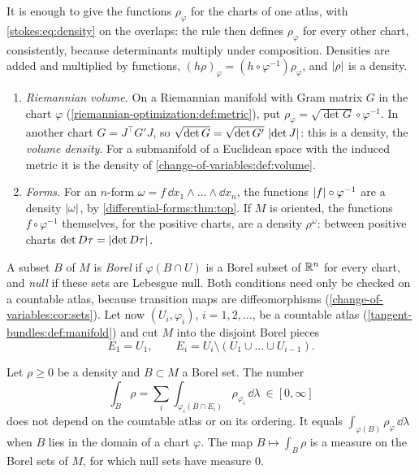\begin{notechapter}
It is enough to give the functions $\rho_\varphi$ for the charts of one
atlas, with \eqref{stokes:eq:density} on the overlaps: the rule then
defines $\rho_\varphi$ for every other chart, consistently, because
determinants multiply under composition. Densities are added and
multiplied by functions, $(h\rho)_\varphi
= (h\circ\varphi^{-1})\rho_\varphi$, and $\left|\rho\right|$ is a density.

\begin{example}\label{stokes:ex:densities}
\begin{enumerate}[nosep]
  \item \emph{Riemannian volume.} On a Riemannian manifold with Gram
        matrix $G$ in the chart $\varphi$
        (\cref{riemannian-optimization:def:metric}), put
        $\rho_\varphi = \sqrt{\det G}\circ\varphi^{-1}$. In another
        chart $G = J^\top G'J$, so
        $\sqrt{\det G} = \sqrt{\det G'}\,\left|\det J\right|$: this is a
        density, the \emph{volume density}. For a submanifold of a
        Euclidean space with the induced metric it is the density of
        \cref{change-of-variables:def:volume}.
  \item \emph{Forms.} For an $n$-form
        $\omega = f\,\dd x_1\wedge\dots\wedge\dd x_n$, the functions
        $\left|f\right|\circ\varphi^{-1}$ are a density $\left|\omega\right|$, by
        \cref{differential-forms:thm:top}. If $M$ is oriented, the
        functions $f\circ\varphi^{-1}$ themselves, for the positive
        charts, are a density $\rho^\omega$: between positive charts
        $\det D\tau = \left|\det D\tau\right|$.
\end{enumerate}
\end{example}

A subset $B$ of $M$ is \emph{Borel} if $\varphi(B\cap U)$ is a Borel
subset of $\mathbb{R}^n$ for every chart, and \emph{null} if these sets are
Lebesgue null. Both conditions need only be checked on a countable
atlas, because transition maps are diffeomorphisms
(\cref{change-of-variables:cor:sets}). Let now $(U_i, \varphi_i)$,
$i = 1, 2,\dots$, be a countable atlas
(\cref{tangent-bundles:def:manifold}) and cut $M$ into the disjoint
Borel pieces
\[
  E_1 = U_1 , \qquad E_i = U_i\setminus(U_1\cup\dots\cup U_{i-1}) .
\]

\begin{theorem}\label{stokes:thm:density}
Let $\rho\geq0$ be a density and $B\subset M$ a Borel set. The number
\[
  \int_B\rho = \sum_i\int_{\varphi_i(B\cap E_i)}\rho_{\varphi_i}\,
  \dd\lambda\ \in[0, \infty]
\]
does not depend on the countable atlas or on its ordering. It equals
$\int_{\varphi(B)}\rho_\varphi\,\dd\lambda$ when $B$ lies in the domain
of a chart $\varphi$. The map $B\mapsto\int_B\rho$ is a measure on the
Borel sets of $M$, for which null sets have measure $0$.
\end{theorem}


\end{notechapter}
